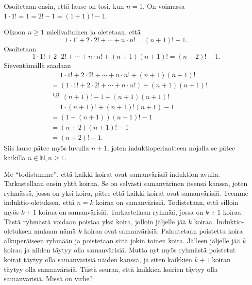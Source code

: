 \documentclass[12pt,a4paper]{article}
\begin{document}
\begin{solution}
  Osoitetaan ensin, että lause on tosi, kun \(n = 1\). On voimassa
  \(1 \cdot 1! = 1 = 2! - 1 = (1 + 1)! - 1\).

  Olkoon \(n \geq 1\) mielivaltainen ja oletetaan, että
  \[
    1 \cdot 1! + 2 \cdot 2! + \cdots + n \cdot n! = (n + 1)! - 1.
  \]
  Osoitetaan
  \[
    1 \cdot 1! + 2 \cdot 2! + \cdots + n \cdot n!
    + (n + 1)(n + 1)! = (n + 2)! - 1.
  \]
  Sieventämällä saadaan
  \begin{align*}
    &\phantom{{}={}} 1 \cdot 1! + 2 \cdot 2! + \cdots + n \cdot n!
    + (n + 1)(n + 1)! \\
    &= \left(1 \cdot 1! + 2 \cdot 2! + \cdots + n \cdot n!\right)
    + (n + 1)(n + 1)! \\
    &\overset{\text{I.O.}}{=} (n + 1)! - 1 + (n + 1)(n + 1)! \\
    &= 1 \cdot (n + 1)! + (n + 1)!(n + 1) - 1 \\
    &= \left(1 + (n + 1)\right)(n + 1)! - 1 \\
    &= (n + 2)(n + 1)! - 1 \\
    &= (n + 2)! - 1.
  \end{align*}
  Siis lause pätee myös luvulla \(n + 1\), joten induktioperiaatteen
  nojalla se pätee kaikilla \(n \in \mathbb{N}, n \geq 1\).
\end{solution}

\begin{exercise}
  Me ``todistamme'', että kaikki koirat ovat samanvärisiä induktion avulla.
  Tarkastellaan ensin yhtä koiraa. Se on selvästi samanvärinen itsensä kanssa,
  joten ryhmässä, jossa on yksi koira, pätee että kaikki koirat ovat
  samanvärisiä. Teemme induktio-oletuksen, että \(n = k\) koiraa on
  samanvärisiä. Todistetaan, että silloin myös \(k + 1\) koiraa on
  samanvärisiä. Tarkastellaan ryhmää, jossa on \(k + 1\) koiraa. Tästä
  ryhmästä voidaan poistaa yksi koira, jolloin jäljelle jää \(k\) koiraa.
  Induktio-oletuksen mukaan nämä \(k\) koiraa ovat samanvärisiä. Palautetaan
  poistettu koira alkuperäiseen ryhmään ja poistetaan siitä jokin toinen
  koira. Jälleen jäljelle jää \(k\) koiraa ja niiden täytyy olla
  samanvärisiä. Mutta nyt myös ryhmästä poistetut koirat täytyy olla
  samanvärisiä näiden kanssa, ja siten kaikkien \(k + 1\) koiran täytyy olla
  samanvärisiä. Tästä seuraa, että kaikkien koirien täytyy olla samanvärisiä.
  Missä on virhe?
\end{exercise}
\end{document}
